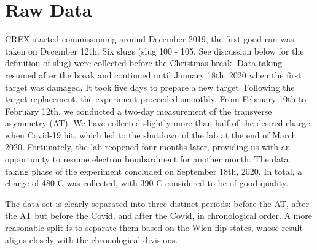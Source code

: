 \begin{comment}
    \begin{itemize}
	\item (design) PREX-II statistical width: $\sim 120\ ppm @30Hz$
	\item (design) BCM resolution: $40\ ppm$
	\item (measured) 1 MHz BCM electronics: $\sim 25\ ppm @30 Hz, 20\ \mu A$
	\item charge and position jitter
	    $$ A_Q: 100-300\ ppm \quad \Delta x: 5-25\ \mu m$$
    \end{itemize}
\end{comment}

\section{Raw Data}
CREX started commissioning around December 2019, the first good run was taken on 
December 12th. Six slugs (slug 100 - 105. See discussion below for the definition of slug) 
were collected before the Christmas break. Data
taking resumed after the break and continued until January 18th, 2020 when the first \Ca 
target was damaged. It took five days to prepare a new target.
Following the target replacement, the experiment proceeded smoothly. 
From February 10th to February 12th, we conducted a two-day measurement of the 
transverse asymmetry (AT). We have collected slightly more than half of the desired
charge when Covid-19 hit, which led to the shutdown of the lab at the end of March 2020. 
Fortunately, the lab reopened four months later, providing us with an opportunity
to resume electron bombardment for another month. 
The data taking phase of the experiment concluded on September 18th, 2020. In total, a charge of 480 C was collected, with 390 C considered to be of good quality.

The data set is clearly separated into three distinct periods: 
before the AT, after the AT but before the Covid, and after the Covid, in chronological order. 
A more reasonable split is to separate them based on the Wien-flip states, 
whose result aligns closely with the chronological divisions.

